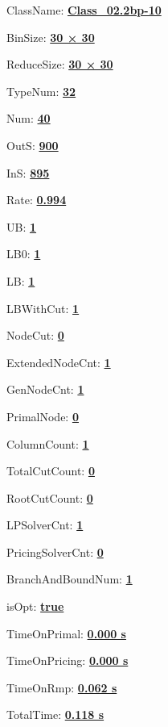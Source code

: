 \documentclass[11pt]{article}
\begin{document}
\pagestyle{empty}


ClassName: \underline{\textbf{Class_02.2bp-10}}
\par
BinSize: \underline{\textbf{30 × 30}}
\par
ReduceSize: \underline{\textbf{30 × 30}}
\par
TypeNum: \underline{\textbf{32}}
\par
Num: \underline{\textbf{40}}
\par
OutS: \underline{\textbf{900}}
\par
InS: \underline{\textbf{895}}
\par
Rate: \underline{\textbf{0.994}}
\par
UB: \underline{\textbf{1}}
\par
LB0: \underline{\textbf{1}}
\par
LB: \underline{\textbf{1}}
\par
LBWithCut: \underline{\textbf{1}}
\par
NodeCut: \underline{\textbf{0}}
\par
ExtendedNodeCnt: \underline{\textbf{1}}
\par
GenNodeCnt: \underline{\textbf{1}}
\par
PrimalNode: \underline{\textbf{0}}
\par
ColumnCount: \underline{\textbf{1}}
\par
TotalCutCount: \underline{\textbf{0}}
\par
RootCutCount: \underline{\textbf{0}}
\par
LPSolverCnt: \underline{\textbf{1}}
\par
PricingSolverCnt: \underline{\textbf{0}}
\par
BranchAndBoundNum: \underline{\textbf{1}}
\par
isOpt: \underline{\textbf{true}}
\par
TimeOnPrimal: \underline{\textbf{0.000 s}}
\par
TimeOnPricing: \underline{\textbf{0.000 s}}
\par
TimeOnRmp: \underline{\textbf{0.062 s}}
\par
TotalTime: \underline{\textbf{0.118 s}}
\par
\newpage
\end{document}
